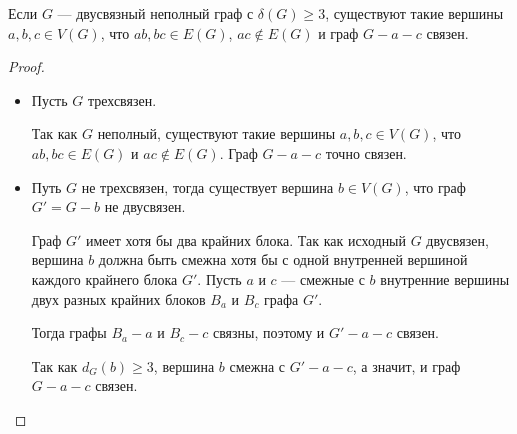 \begin{lemma}\label{lm:coloring_2}
    Если $G$ --- двусвязный неполный граф с $\delta(G) \ge 3$, существуют такие вершины $a, b, c \in V(G)$, что $ab, bc \in E(G)$, $ac \notin E(G)$ и граф $G-a-c$ связен.
\end{lemma}

\begin{proof}
	\begin{itemize}
		\item Пусть $G$ трехсвязен.

			Так как $G$ неполный, существуют такие вершины $a, b, c \in V(G)$, что $ab, bc \in E(G)$ и $ac \notin E(G)$. Граф $G-a-c$ точно связен. 
		\item Путь $G$ не трехсвязен, тогда существует вершина $b \in V(G)$, что граф $G' = G - b$ не двусвязен.

			Граф $G'$ имеет хотя бы два крайних блока. Так как исходный $G$ двусвязен, вершина  $b$ должна быть смежна хотя бы с одной внутренней вершиной каждого крайнего блока $G'$. Пусть $a$ и $c$ --- смежные с $b$ внутренние вершины двух разных крайних блоков $B_a$ и $B_c$ графа $G'$.
		\begin{figure}[ht]
			\centering
			\caption{}
			\label{fig:checkmark-lemma}
		\end{figure}
		
		Тогда графы $B_a - a$ и $B_c - c$ связны, поэтому и $G'- a -c $ связен.

		Так как $d_G(b) \ge 3$, вершина $b$ смежна с $G'-a-c$, а значит, и граф $G -a-c$ связен.
	\end{itemize}
\end{proof}
